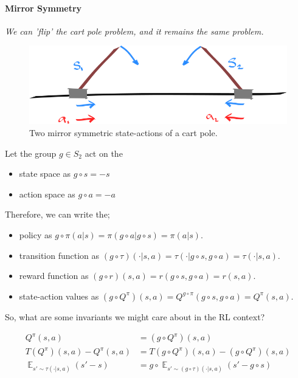 \paragraph{Mirror Symmetry}

\begin{displayquote}
  \textit{We can 'flip' the cart pole problem, and it remains the same problem.}
\end{displayquote}

\begin{figure}[h!]
	\centering
	\includegraphics[width=1\textwidth,height=0.25\textheight]{../../pictures/drawings/cart-pole-mirror.png}
	\caption{Two mirror symmetric state-actions of a cart pole.}
\end{figure}

Let the group $g\in S_2$ act on the

\begin{itemize}
	\tightlist
	\item state space as $g \circ s = -s$
	\item action space as $g \circ a = -a$
\end{itemize}

Therefore, we can write the;
\begin{itemize}
	\tightlist
 	\item policy as $g \circ \pi(a | s) = \pi(g \circ a | g \circ s) = \pi(a | s)$.
	\item transition function as $(g \circ \tau)(\cdot | s, a) = \tau(\cdot| g \circ s, g \circ a) = \tau(\cdot | s, a)$.
	\item reward function as $(g \circ r)(s, a) = r(g \circ s, g \circ a) = r(s, a)$.
  \item state-action values as $(g \circ Q^{\pi})(s, a) = Q^{g \circ \pi}(g \circ s, g \circ a) = Q^{\pi}(s, a)$.
\end{itemize}

So, what are some invariants we might care about in the RL context?

\begin{align*}
Q^\pi(s, a) &= (g \circ Q^{\pi})(s, a) \tag{expected return}\\
T(Q^\pi)(s,a) - Q^\pi(s,a) &=T(g \circ Q^\pi)(s, a) - (g \circ Q^\pi)(s,a) \tag{Bellman residual}\\
\mathop{\mathbb E}_{s' \sim \tau(\cdot| s, a)} (s' - s) &= g \circ \mathop{\mathbb E}_{s' \sim (g \circ \tau)(\cdot| s, a)} (s' - g \circ s) \tag{change in state}\\
\end{align*}

